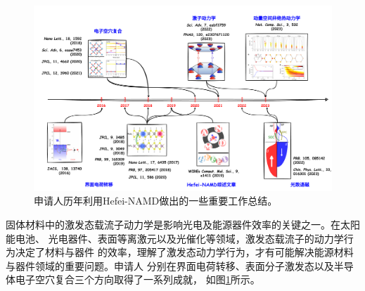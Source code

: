 \documentclass[12pt,UTF8,AutoFakeBold=3,a4paper]{article}
\begin{document}
\begin{figure}[ht]
  \centering
  \includegraphics[width=1.\linewidth]{figs/rep_work.pdf}
  \caption{\label{fig:fig_rep_work}
    \kaishu{}
    申请人历年利用Hefei-NAMD做出的一些重要工作总结。
  }
\end{figure}


固体材料中的激发态载流子动力学是影响光电及能源器件效率的关键之一。在太阳能电池、
光电器件、表面等离激元以及光催化等领域，激发态载流子的动力学行为决定了材料与器件
的效率，理解了激发态动力学行为，才有可能解决能源材料与器件领域的重要问题。申请人
分别在界面电荷转移、表面分子激发态以及半导体电子空穴复合三个方向取得了一系列成就，
如图\ref{fig:fig_rep_work}所示。
\end{document}
